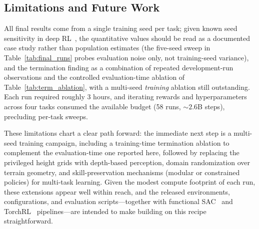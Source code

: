 \documentclass[conference,a4paper]{IEEEtran}
\begin{document}
\subsection{Limitations and Future Work}
\label{sec:limitations}
All final results come from a single training seed per task; given known seed sensitivity in deep RL~\cite{henderson2018matters,agarwal2021precipice}, the quantitative values should be read as a documented case study rather than population estimates (the five-seed sweep in Table~\ref{tab:final_runs} probes evaluation noise only, not training-seed variance), and the termination finding as a combination of repeated development-run observations and the controlled evaluation-time ablation of Table~\ref{tab:term_ablation}, with a multi-seed \emph{training} ablation still outstanding. Each run required roughly 3 hours, and iterating rewards and hyperparameters across four tasks consumed the available budget (58 runs, ${\sim}2.6$B steps), precluding per-task sweeps.

These limitations chart a clear path forward: the immediate next step is a multi-seed training campaign, including a training-time termination ablation to complement the evaluation-time one reported here, followed by replacing the privileged height grids with depth-based perception, domain randomization over terrain geometry, and skill-preservation mechanisms (modular or constrained policies) for multi-task learning. Given the modest compute footprint of each run, these extensions appear well within reach, and the released environments, configurations, and evaluation scripts---together with functional SAC~\cite{haarnoja2018sac} and TorchRL~\cite{bou2024torchrl} pipelines---are intended to make building on this recipe straightforward.



\end{document}
